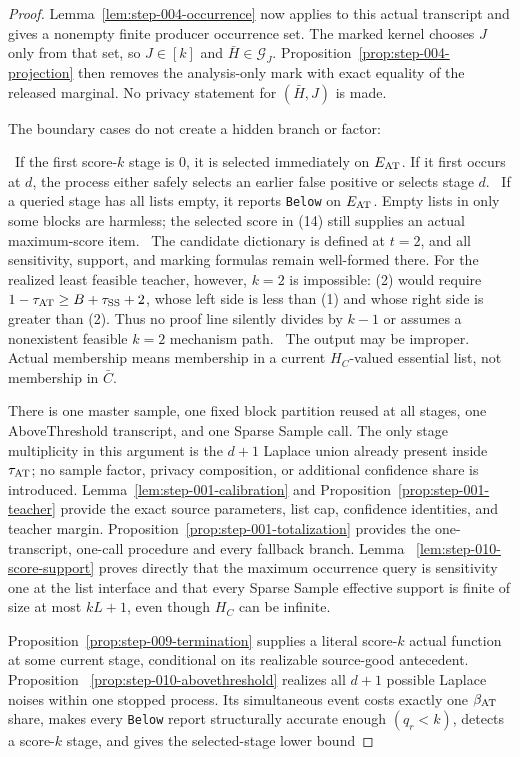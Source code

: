 \begin{proof}
Lemma~\ref{lem:step-004-occurrence} now applies to this actual
transcript and gives a nonempty finite producer occurrence set. The marked
kernel chooses \(J\) only from that set, so \(J\in[k]\) and
\(\bar H\in\mathcal G_J\). Proposition~\ref{prop:step-004-projection} then removes the analysis-only
mark with exact equality of the released marginal. No privacy statement for
\((\bar H,J)\) is made.

The boundary cases do not create a hidden branch or factor:

\noindent \ If the first score-\(k\) stage is \(0\), it is selected immediately on
  \(E_{\rm AT}\). If it first occurs at \(d\), the process either safely
  selects an earlier false positive or selects stage \(d\).
\noindent \ If a queried stage has all lists empty, it reports \texttt{Below} on
  \(E_{\rm AT}\). Empty lists in only some blocks are harmless; the selected
  score in (14) still supplies an actual maximum-score item.
\noindent \ The candidate dictionary is defined at \(t=2\), and all sensitivity,
  support, and marking formulas remain well-formed there. For the realized
  least feasible teacher, however, \(k=2\) is impossible: (2) would require
  \(1-\tau_{\rm AT}\geq B+\tau_{\rm SS}+2\), whose left side is less than
  (1) and whose right side is greater than (2). Thus no proof line
  silently divides by \(k-1\) or assumes a nonexistent feasible \(k=2\)
  mechanism path.
\noindent \ The output may be improper. Actual membership means membership in a
  current \(H_C\)-valued essential list, not membership in \(\bar C\).

There is one master sample, one fixed block partition reused at all stages,
one AboveThreshold transcript, and one Sparse Sample call. The only stage
multiplicity in this argument is the \(d+1\) Laplace union already present
inside \(\tau_{\rm AT}\); no sample factor, privacy composition, or
additional confidence share is introduced. 
Lemma~\ref{lem:step-001-calibration} and
Proposition~\ref{prop:step-001-teacher} provide the exact source parameters,
list cap, confidence identities, and teacher margin. Proposition~\ref{prop:step-001-totalization} provides the one-transcript,
one-call procedure and every fallback branch. Lemma
~\ref{lem:step-010-score-support} proves directly that the maximum
occurrence query is sensitivity one at the list interface and that every
Sparse Sample effective support is finite of size at most \(kL+1\), even
though \(H_C\) can be infinite.

Proposition~\ref{prop:step-009-termination} supplies a literal
score-\(k\) actual function at some current stage, conditional on its
 realizable source-good antecedent. Proposition
~\ref{prop:step-010-abovethreshold} realizes all \(d+1\) possible Laplace
noises within one stopped process. Its simultaneous event costs exactly one
\(\beta_{\rm AT}\) share, makes every \texttt{Below} report structurally accurate
enough \((q_r<k)\), detects a score-\(k\) stage, and gives the selected-stage
lower bound


\end{proof}

